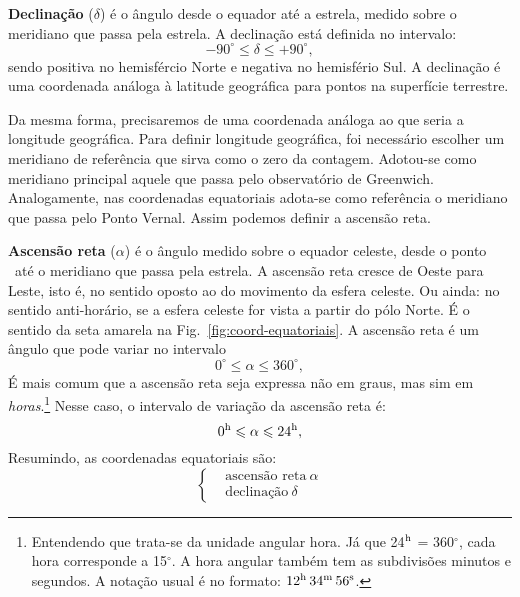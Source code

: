 \textbf{Declinação} ($\delta$) é o ângulo desde o equador até a estrela, medido sobre o meridiano que passa pela estrela. A declinação está definida no intervalo:
%
\begin{equation}
-90^{\circ} \leqslant \delta \leqslant +90^{\circ},
\end{equation}
%
sendo positiva no hemisfércio Norte e negativa no hemisfério Sul. A declinação é uma coordenada análoga à latitude geográfica para pontos na superfície terrestre.

Da mesma forma, precisaremos de uma coordenada análoga ao que seria a longitude geográfica. Para definir longitude geográfica, foi necessário escolher um meridiano de referência que sirva como o zero da contagem. Adotou-se como meridiano principal aquele que passa pelo observatório de Greenwich. Analogamente, nas coordenadas equatoriais adota-se como referência o meridiano que passa pelo Ponto Vernal. Assim podemos definir a ascensão reta.

\textbf{Ascensão reta} ($\alpha$) é o ângulo medido sobre o equador celeste, desde o ponto \Aries\ até o meridiano que passa pela estrela. A ascensão reta cresce de Oeste para Leste, isto é, no sentido oposto ao do movimento da esfera celeste. Ou ainda: no sentido anti-horário, se a esfera celeste for vista a partir do pólo Norte. É o sentido da seta amarela na Fig.~\ref{fig:coord-equatoriais}. A ascensão reta é um ângulo que pode variar no intervalo
%
\begin{equation}
0^{\circ} \leqslant \alpha \leqslant 360^{\circ},
\end{equation}
%
É mais comum que a ascensão reta seja expressa não em graus, mas sim em \textit{horas}.\footnote{Entendendo que trata-se da unidade angular hora. Já que 24$^{\rm h}$ = 360$^{\circ}$, cada hora corresponde a 15$^{\circ}$. A hora angular também tem as subdivisões minutos e segundos. A notação usual é no formato: $12^{\rm h}\,34^{\rm m}\,56^{\rm s}$.} Nesse caso, o intervalo de variação da ascensão reta é:
%
\begin{equation}
0^{\rm h} \leqslant \alpha \leqslant 24^{\rm h},
\end{equation}
%
Resumindo, as coordenadas equatoriais são:
%
\begin{equation*}
\left\{
\begin{aligned}
& \text{ascensão reta}~\alpha\\
& \text{declinação}~\delta
\end{aligned}
\right.
\end{equation*}

